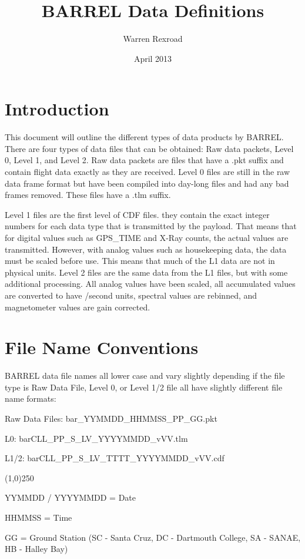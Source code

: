 \documentclass{article}
\title{BARREL Data Definitions}
\author{Warren Rexroad}
\date{April 2013}
\begin{document}
\maketitle

\section{Introduction}
This document will outline the different types of data products by BARREL. There are four types of data files that can be obtained: Raw data packets, Level 0, Level 1, and Level 2. Raw data packets are files that have a .pkt suffix and contain flight data exactly as they are received. Level 0 files are still in the raw data frame format but have been compiled into day-long files and had any bad frames removed. These files have a .tlm suffix.

Level 1 files are the first level of CDF files. they contain the exact integer numbers for each data type that is transmitted by the payload. That means that for digital values such as GPS\_TIME and X-Ray counts, the actual values are transmitted. However, with analog values such as housekeeping data, the data must be scaled before use. This means that much of the L1 data are not in physical units. Level 2 files are the same data from the L1 files, but with some additional processing. All analog values have been scaled, all accumulated values are converted to have /second units, spectral values are rebinned, and magnetometer values are gain corrected.

\section{File Name Conventions}
BARREL data file names all lower case and vary slightly depending if the file type is Raw Data File, Level 0, or Level 1/2 file all have slightly different file name formats:

Raw Data Files: bar\_YYMMDD\_HHMMSS\_PP\_GG.pkt

L0: barCLL\_PP\_S\_LV\_YYYYMMDD\_vVV.tlm

L1/2: barCLL\_PP\_S\_LV\_TTTT\_YYYYMMDD\_vVV.cdf

\begin{center}
\line(1,0){250}
\end{center}

YYMMDD / YYYYMMDD = Date

HHMMSS = Time

GG = Ground Station (SC - Santa Cruz, DC - Dartmouth College, SA - SANAE, HB - Halley Bay)
\end{document}
